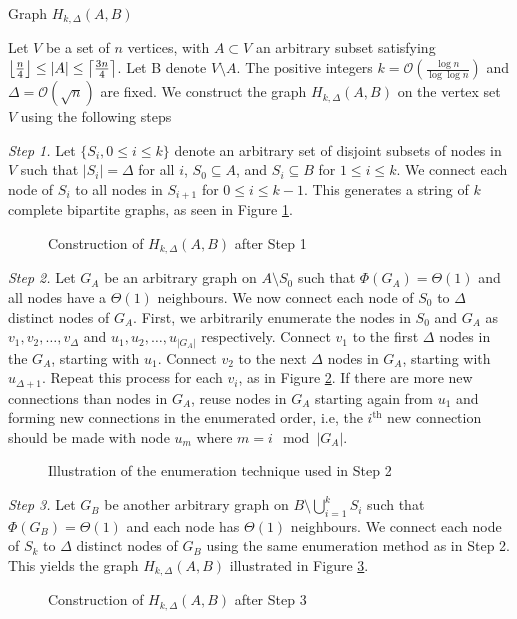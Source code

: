 \begin{definition}\label{def:HkAB}
 	Graph $H_{k, \Delta}(A,B)$

	Let $V$ be a set of $n$ vertices, with $A \subset V$ an arbitrary subset satisfying $\floor*{\frac{n}{4}} \leq |A| \leq \ceil*{\frac{3n}{4}}$.
	Let B denote $V \setminus A$. The positive integers $k = \mathcal{O}\left(\frac{\log n}{\log \log n}\right)$ and $\Delta = \mathcal{O}(\sqrt{n})$ are fixed. We construct the graph $H_{k, \Delta}(A,B)$ on the vertex set $V$ using the following steps

	\textit{Step 1.} Let $\{S_i, 0 \leq i \leq k\}$ denote an arbitrary set of disjoint subsets of nodes in $V$ such that $|S_i| = \Delta$ for all $i$, $S_0 \subseteq A$, and $S_i \subseteq B$ for $1 \leq i \leq k$. We connect each node of $S_i$ to all nodes in $S_{i+1}$ for $0 \leq i \leq k - 1$. This generates a string of $k$ complete bipartite graphs, as seen in Figure \ref{fig:HkAB_1}.

    \begin{figure}[h]
        \centering
        
        \caption{Construction of $H_{k, \Delta}(A,B)$ after Step 1}
        \label{fig:HkAB_1}
    \end{figure} 

	\textit{Step 2.} Let $G_A$ be an arbitrary 
	graph on $A \setminus S_0$ such that $\Phi(G_A) = \Theta(1)$ and all nodes have a $\Theta(1)$ neighbours. %
	We now connect each node of $S_0$ to $\Delta$ distinct nodes of $G_A$. First, we arbitrarily enumerate the nodes in $S_0$ and $G_A$ as $v_1, v_2, \dots, v_\Delta$ and $u_1, u_2, \dots, u_{|G_A|}$ respectively. Connect $v_1$ to the first $\Delta$ nodes in the $G_A$, starting with $u_1$. Connect $v_2$ to the next $\Delta$ nodes in $G_A$, starting with $u_{\Delta + 1}$.
	Repeat this process for each $v_i$, as in Figure \ref{fig:HkAB_2}.
	If there are more new connections than nodes in $G_A$, reuse nodes in $G_A$ starting again from $u_1$ and forming new connections in the enumerated order, i.e, the $i^\text{th}$ new connection should be made with node $u_m$ where $m = i\mod |G_A|$.

    \begin{figure}[h]
        \centering
        
        \caption{Illustration of the enumeration technique used in Step 2}
        \label{fig:HkAB_2}
    \end{figure}

	\textit{Step 3.} Let $G_B$ be another arbitrary graph on $B \setminus \bigcup_{i=1}^k S_i$ such that $\Phi(G_B) = \Theta(1)$ and each node has $\Theta(1)$ neighbours. 
	We connect each node of $S_k$ to $\Delta$ distinct nodes of $G_B$ using the same enumeration method as in Step 2. This yields the graph $H_{k, \Delta}(A,B)$ illustrated in Figure \ref{fig:HkAB_3}.

    \begin{figure}[h]
        \centering
        
        \caption{Construction of $H_{k, \Delta}(A,B)$ after Step 3}
        \label{fig:HkAB_3}
    \end{figure}

\end{definition}

